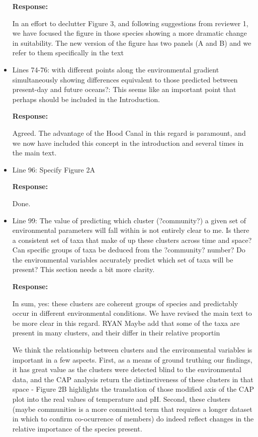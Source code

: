 \documentclass[11pt]{article}
\begin{document}
\begin{linenumbers}
\begin{itemize}
\textbf{Response:}

In an effort to declutter Figure 3, and following suggestions from reviewer 1, we have focused the figure in those species showing a more dramatic change in suitability. The new version of the figure has two panels (A and B) and we refer to them specifically in the text

\item{Lines 74-76: with different points along the environmental gradient simultaneously showing differences equivalent to those predicted between present-day and future oceans?: This seems like an important point that perhaps should be included in the Introduction.}

\textbf{Response:}

Agreed. The advantage of the Hood Canal in this regard is paramount, and we now have included this concept in the introduction and several times in the main text.

\item{Line 96: Specify Figure 2A}

\textbf{Response:}

Done.

\item{Line 99: The value of predicting which cluster (?community?) a given set of environmental parameters will fall within is not entirely clear to me. Is there a consistent set of taxa that make of up these clusters across time and space? Can specific groups of taxa be deduced from the ?community? number? Do the environmental variables accurately predict which set of taxa will be present? This section needs a bit more clarity.}

\textbf{Response:}

In sum, yes: these clusters are coherent groups of species and predictably occur in different environmental conditions. We have revised the main text to be more clear in this regard. {\color{red} RYAN Maybe add that some of the taxa are present in many clusters, and their differ in their relative proportin }

We think the relationship between clusters and the environmental variables is important in a few aspects. First, as a means of ground truthing our findings, it has great value as the clusters were detected blind to the environmental data, and the CAP analysis return the distinctiveness of these clusters in that space - Figure 2B highlights the translation of those modified axis of the CAP plot into the real values of temperature and pH. Second, these clusters (maybe communities is a more committed term that requires a longer dataset in which to confirm co-ocurrence of members) do indeed reflect changes in the relative importance of the species present.


\end{itemize}
\end{linenumbers}
\end{document}

